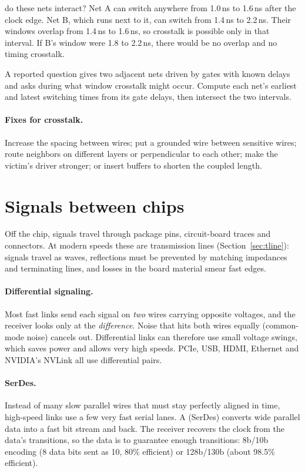 \begin{worked}{do these nets interact?}
Net A can switch anywhere from 1.0\,ns to 1.6\,ns after the clock edge. Net B, which runs next to it, can switch from 1.4\,ns to 2.2\,ns. Their windows overlap from 1.4\,ns to 1.6\,ns, so crosstalk is possible only in that interval. If B's window were 1.8 to 2.2\,ns, there would be no overlap and no timing crosstalk.
\end{worked}

\begin{onoa}
A reported question gives two adjacent nets driven by gates with known delays and asks during what window crosstalk might occur. Compute each net's earliest and latest switching times from its gate delays, then intersect the two intervals.
\end{onoa}

\paragraph{Fixes for crosstalk.} Increase the spacing between wires; put a grounded  wire between sensitive wires; route neighbors on different layers or perpendicular to each other; make the victim's driver stronger; or insert buffers to shorten the coupled length.

\section{Signals between chips}

Off the chip, signals travel through package pins, circuit-board traces and connectors. At modern speeds these are transmission lines (Section~\ref{sec:tline}): signals travel as waves, reflections must be prevented by matching impedances and terminating lines, and losses in the board material smear fast edges.

\paragraph{Differential signaling.} Most fast links send each signal on \emph{two} wires carrying opposite voltages, and the receiver looks only at the \emph{difference}. Noise that hits both wires equally (common-mode noise) cancels out. Differential links can therefore use small voltage swings, which saves power and allows very high speeds. PCIe, USB, HDMI, Ethernet and NVIDIA's NVLink all use differential pairs.

\paragraph{SerDes.} Instead of many slow parallel wires that must stay perfectly aligned in time, high-speed links use a few very fast serial lanes. A  (SerDes) converts wide parallel data into a fast bit stream and back. The receiver recovers the clock from the data's transitions, so the data is  to guarantee enough transitions: 8b/10b encoding (8 data bits sent as 10, 80\% efficient) or 128b/130b (about 98.5\% efficient).

